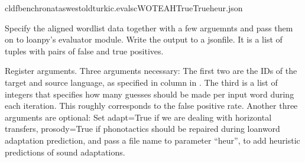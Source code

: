 \documentclass[letterpaper,10pt,english]{sphinxmanual}
\begin{document}
\begin{sphinxVerbatim}[commandchars=\\\{\}]
cldfbenchronataswestoldturkic.evalscWOTEAHTrueTrueheur.json
\end{sphinxVerbatim}
\label{\detokenize{mkloanpy:module-ronataswestoldturkiccommands.evalsc}}
\sphinxAtStartPar
Specify the aligned wordlist data together with a few arguemnts
and pass them on to loanpy’s evaluator module. Write the output
to a json\sphinxhyphen{}file. It is a list of tuples with pairs of
false and true positives.

\begin{fulllineitems}
\label{\detokenize{mkloanpy:ronataswestoldturkiccommands.evalsc.register}}
\pysigstartsignatures
{}
\pysigstopsignatures
\sphinxAtStartPar
Register arguments. Three arguments necessary: The first two are the IDs
of the target and source language, as specified in column  in
. The third is a list of integers that specifies
how many guesses should be made per input word during each iteration.
This roughly corresponds to the false positive rate. Another three
arguments are optional: Set adapt=True if we are dealing with horizontal
transfers, prosody=True if phonotactics should be repaired during
loanword adaptation prediction, and pass a file name to parameter “heur”,
to add heuristic predictions of sound adaptations.

\end{fulllineitems}

\end{document}
